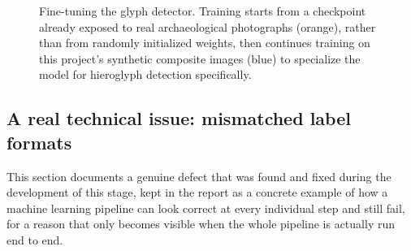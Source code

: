 \documentclass[11pt,a4paper]{report}
\begin{document}
\begin{figure}[t]
\centering
{}
\caption{Fine-tuning the glyph detector. Training starts from a checkpoint
already exposed to real archaeological photographs (orange), rather than
from randomly initialized weights, then continues training on this
project's synthetic composite images (blue) to specialize the model for
hieroglyph detection specifically.}
\label{fig:finetuning}
\end{figure}

\subsection{A real technical issue: mismatched label formats}
\label{sec:the-bug}

This section documents a genuine defect that was found and fixed during the
development of this stage, kept in the report as a concrete example of how
a machine learning pipeline can look correct at every individual step and
still fail, for a reason that only becomes visible when the whole pipeline
is actually run end to end.
\end{document}
